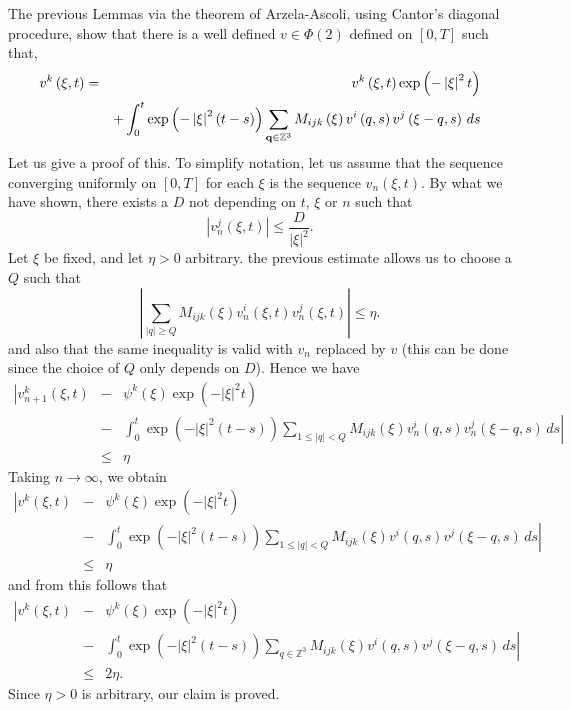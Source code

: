 \documentclass{amsart}
\begin{document}
The previous Lemmas via the theorem of Arzela-Ascoli, using Cantor's diagonal procedure, show
that there is a well defined $v\in \Phi\left(2\right)$ defined on 
$\left[0,T\right]$ such that,
\begin{eqnarray}
\label{fundamentalequation}
v^k\left(\xi,t\right)&=&
v^k\left(\xi,t\right)\exp\left(-\left|\xi\right|^2 t\right)\\\notag
&&
+\int_{0}^t\exp\left(-\left|\xi\right|^2\left(t-s\right)\right)\sum_{\mathbf{q}\in\mathbb{Z}^3}
M_{ijk}\left(\xi\right)v^i\left(q,s\right)v^j\left(\xi-q,s\right)\, ds
\end{eqnarray}
Let us give a proof of this. To simplify notation, let us assume that the sequence converging uniformly
on $\left[0,T\right]$ for each $\xi$ is the sequence $v_n\left(\xi,t\right)$. By what we have shown, there exists
a $D$ not depending on $t$, $\xi$ or $n$ such that 
\[
\left|v_n^j\left(\xi,t\right)\right|\leq \frac{D}{\left|\xi\right|^2}.
\]
Let $\xi$ be fixed, and let $\eta>0$ arbitrary. the previous estimate allows us to choose a $Q$ such that 
\[
\left|\sum_{\left|q\right|\geq Q}M_{ijk}\left(\xi\right)v_n^i\left(\xi,t\right)v_n^j\left(\xi,t\right)\right|
\leq \eta.
\]
and also that the same inequality is valid with $v_n$ replaced by $v$ (this can be done since the
choice of $Q$ only depends on $D$).
Hence we have
\begin{eqnarray*}
\left|v_{n+1}^k\left(\xi,t\right)\right.&-&\psi^k\left(\xi\right)\exp\left(-\left|\xi\right|^2 t\right)\\
&-&\left.\int_{0}^t
\exp\left(-\left|\xi\right|^2\left(t-s\right)\right)\sum_{1\leq\left|q\right|<Q}
M_{ijk}\left(\xi\right)v_n^i\left(q,s\right)v_n^j\left(\xi-q,s\right)\, ds\right|\\
&\leq& \eta
\end{eqnarray*}
Taking $n\rightarrow \infty$, we obtain
\begin{eqnarray*}
\left|v^k\left(\xi,t\right)\right.&-&\psi^k\left(\xi\right)\exp\left(-\left|\xi\right|^2 t\right)\\
&-&\left.\int_{0}^t
\exp\left(-\left|\xi\right|^2\left(t-s\right)\right)\sum_{1\leq\left|q\right|<Q}
M_{ijk}\left(\xi\right)v^i\left(q,s\right)v^j\left(\xi-q,s\right)\, ds\right|\\
&\leq& \eta
\end{eqnarray*}
and from this follows that
\begin{eqnarray*}
\left|v^k\left(\xi,t\right)\right.&-&\psi^k\left(\xi\right)\exp\left(-\left|\xi\right|^2 t\right)\\
&-&\left.\int_{0}^t
\exp\left(-\left|\xi\right|^2\left(t-s\right)\right)\sum_{q\in\mathbb{Z}^3}
M_{ijk}\left(\xi\right)v^i\left(q,s\right)v^j\left(\xi-q,s\right)\, ds\right|\\
&\leq& 2\eta.
\end{eqnarray*}
Since $\eta>0$ is arbitrary, our claim is proved. 
\end{document}
